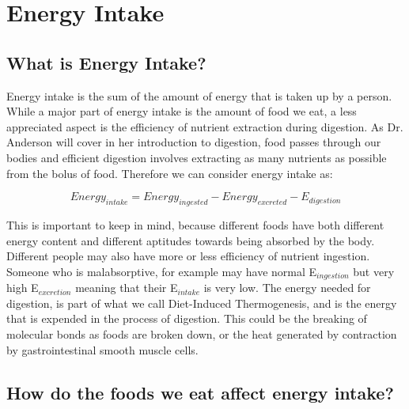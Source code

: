\documentclass{tufte-handout}
\begin{document}
\section{Energy Intake}

\subsection{What is Energy Intake?}
Energy intake is the sum of the amount of energy that is taken up by a person.  While a major part of energy intake is the amount of food we eat, a less appreciated aspect is the efficiency of nutrient extraction during digestion.  As Dr. Anderson will cover in her introduction to digestion, food passes through our bodies and efficient digestion involves extracting as many nutrients as possible from the bolus of food.  Therefore we can consider energy intake as:

\begin{equation}
Energy_{intake} = Energy_{ingested} - Energy_{excreted} - E_{digestion}
\end{equation}

This is important to keep in mind, because different foods have both different energy content and different aptitudes towards being absorbed by the body.  Different people may also have more or less efficiency of nutrient ingestion.  Someone who is malabsorptive, for example may have normal E$_{ingestion}$ but very high E$_{excretion}$ meaning that their E$_{intake}$ is very low.  The energy needed for digestion, is part of what we call Diet-Induced Thermogenesis, and is the energy that is expended in the process of digestion.  This could be the breaking of molecular bonds as foods are broken down, or the heat generated by contraction by gastrointestinal smooth muscle cells.

\subsection{How do the foods we eat affect energy intake?}
\end{document}
